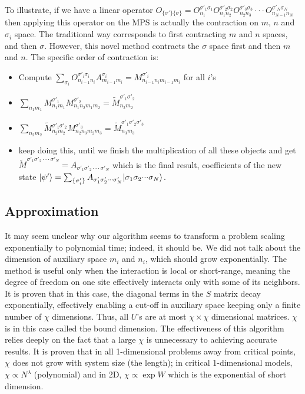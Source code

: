 \documentclass[english]{article}
\begin{document}
To illustrate, if we have a linear operator $O_{\{\sigma'\}\{\sigma\}}=O_{n_{1}}^{\sigma'_{1}\sigma_{1}}O_{n_{1}n_{2}}^{\sigma'_{2}\sigma_{2}}O_{n_{2}n_{3}}^{\sigma'_{3}\sigma_{3}}\cdot\cdot\cdot O_{n_{N-1}n_{N}}^{\sigma'_{N}\sigma_{N}}$
then applying this operator on the MPS is actually the contraction
on $m$, $n$ and $\sigma_{i}$ space. The traditional way corresponds
to first contracting $m$ and $n$ spaces, and then $\sigma$. However, this
novel method contracts the $\sigma$ space first and then $m$ and
$n$. The specific order of contraction is:
\begin{itemize}
\item Compute $\sum_{\sigma_{i}}O_{n_{i-1}n_{i}}^{\sigma'_{i}\sigma_{i}}A_{m_{i-1}m_{i}}^{\sigma_{i}}=M_{n_{i-1}n_{i}m_{i-1}m_{i}}^{\sigma'_{i}}$
for all $i$'s
\item $\sum_{n_{1}m_{1}}M_{n_{1}m_{1}}^{\sigma'_{1}}M_{n_{1}n_{2}m_{1}m_{2}}^{\sigma'_{2}}=\tilde{M}_{n_{2}m_{2}}^{\sigma'_{1}\sigma'_{2}}$
\item $\sum_{n_{2}m_{2}}\tilde{M}{}_{n_{2}m_{2}}^{\sigma'_{1}\sigma'_{2}}M_{n_{2}n_{3}m_{2}m_{3}}^{\sigma'_{3}}=\tilde{M}_{n_{3}m_{3}}^{\sigma'_{1}\sigma'_{2}\sigma'_{3}}$
\item keep doing this, until we finish the multiplication of all these objects
and get $\tilde{M}^{\sigma'_{1}\sigma'_{2}\cdot\cdot\cdot\sigma'_{N}}=A_{\sigma'_{1}\sigma'_{2}\cdot\cdot\cdot\sigma'_{N}}$
which is the final result, coefficients of the new state $|\psi'\rangle=\sum_{\{\sigma'_{i}\}}A_{\sigma'_{1}\sigma'_{2}\cdot\cdot\cdot\sigma'_{N}}|\sigma_{1}\sigma_{2}\text{\ensuremath{\cdot}}\text{\ensuremath{\cdot}}\text{\ensuremath{\cdot}}\sigma_{N}\rangle$.
\end{itemize}

\subsection{Approximation}

It may seem unclear why our algorithm seems to transform a
 problem scaling exponentially to polynomial time; indeed, it should be.
We did not talk about the dimension of auxiliary space $m_{i}$ and
$n_{i}$, which should grow exponentially. The method is useful
only when the interaction is local or short-range, meaning the
degree of freedom on one site  effectively interacts only with some
of its neighbors. It is proven that in this case, the diagonal terms
in the $S$ matrix decay exponentially, effectively enabling a cut-off
in auxiliary space keeping only a finite number of $\chi$ dimensions. Thus, all $U$'s are at most $\chi\times\chi$ dimensional matrices.
$\chi$ is in this case called the bound dimension. The effectiveness of this algorithm
relies deeply on the fact that a large $\chi$ is unnecessary to achieving accurate
results. It is proven that in all 1-dimensional problems away from critical
points, $\chi$ does not grow with system size (the length); in critical
1-dimensional models, $\chi\propto N^{\lambda}$ (polynomial) and
in 2D, $\chi\propto\exp W$ which is the exponential of short dimension.
\end{document}
